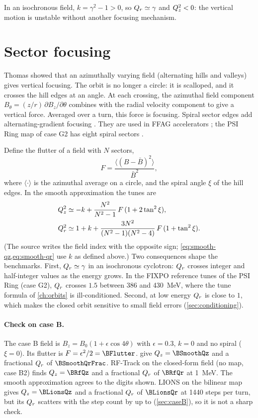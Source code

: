 In an isochronous field, $k = \gamma^2-1 > 0$, so $Q_r\simeq\gamma$ and $Q_z^2<0$: the vertical motion is unstable without
another focusing mechanism.

\section{Sector focusing}
Thomas \cite{thomas1938} showed that an azimuthally varying field (alternating hills and valleys) gives vertical
focusing.
The orbit is no longer a circle: it is scalloped, and it crosses the hill edges at an angle.
At each crossing, the azimuthal field component $B_\theta = (z/r)\,\partial B_z/\partial\theta$ combines with the radial
velocity component to give a vertical force.
Averaged over a turn, this force is focusing.
Spiral sector edges add alternating-gradient focusing \cite{courant1958}.
They are used in FFAG accelerators \cite{symon1956}; the PSI Ring map of case G2 has eight spiral sectors
\cite{grillenberger2021}.

Define the flutter of a field with $N$ sectors,
\begin{equation}
F = \frac{\langle (B-\bar B)^2\rangle}{\bar B^2},
\end{equation}
where $\langle\cdot\rangle$ is the azimuthal average on a circle, and the spiral angle $\xi$ of the hill edges.
In the smooth approximation the tunes are \cite{zaremba2017}
\begin{align}
Q_z^2 &\simeq -k + \frac{N^2}{N^2-1}\,F\,(1+2\tan^2\xi), \label{eq:smooth-qz}\\
Q_r^2 &\simeq 1 + k + \frac{3N^2}{(N^2-1)(N^2-4)}\,F\,(1+\tan^2\xi). \label{eq:smooth-qr}
\end{align}
(The source writes the field index with the opposite sign; \cref{eq:smooth-qz,eq:smooth-qr} use $k$ as defined above.)
Two consequences shape the benchmarks.
First, $Q_r\simeq\gamma$ in an isochronous cyclotron: $Q_r$ crosses integer and half-integer values as the energy grows.
In the FIXPO reference tunes of the PSI Ring (case G2), $Q_r$ crosses $1.5$ between 386 and \SI{430}{MeV}, where the
tune formula of \cref{ch:orbits} is ill-conditioned.
Second, at low energy $Q_r$ is close to $1$, which makes the closed orbit sensitive to small field errors
(\cref{sec:conditioning}).

\paragraph{Check on case B.}
The case B field is $B_z = B_0(1+\epsilon\cos 4\theta)$ with $\epsilon = 0.3$, $k=0$ and no spiral ($\xi = 0$).
Its flutter is $F = \epsilon^2/2 = \BFlutter$.
 give $\Qz = \BSmoothQz$ and a fractional $Q_r$ of $\BSmoothQrFrac$.
RF-Track on the closed-form field (no map, case B2) finds $\Qz = \BRfQz$ and a fractional $Q_r$ of $\BRfQr$ at 1~MeV.
The smooth approximation agrees to the digits shown.
LIONS on the bilinear map gives $\Qz = \BLionsQz$ and a fractional $Q_r$ of $\BLionsQr$ at 1440 steps per turn, but its
$Q_r$ scatters with the step count by up to \BLionsQrSpread{} (\cref{sec:caseB}), so it is not a sharp check.

